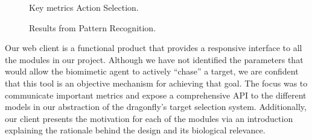 \documentclass[a4paper,11pt]{article}
\begin{document}
\begin{figure}[H]
\begin{minipage}{0.5\textwidth}
\centering
{}
\caption{Key metrics Action Selection.}
\end{minipage}
\begin{minipage}{0.5\textwidth}
\centering
{}
\caption{Results from Pattern Recognition.}
\end{minipage}
\end{figure}

Our web client is a functional product that provides a responsive interface to all the modules
in our project. Although we have not identified the parameters that would allow the biomimetic
agent to actively ``chase'' a target, we are confident that this tool is an objective mechanism
for achieving that goal. The focus was to communicate important metrics and expose a comprehensive
API to the different models in our abstraction of the dragonfly's target selection system. Additionally, our
client presents the motivation for each of the modules via an introduction explaining the rationale
behind the design and its biological relevance.
\end{document}
